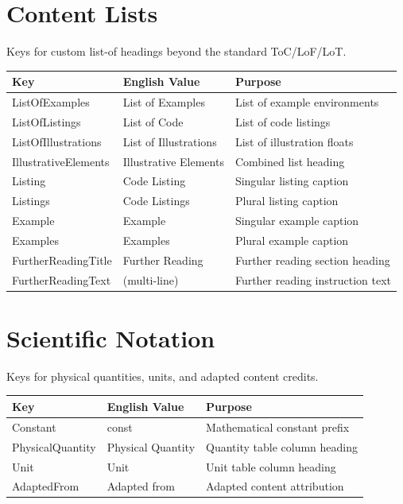 \section{Content Lists}
\label{sec:tl-lists}

Keys for custom list-of headings beyond the standard ToC/LoF/LoT.

\begin{tabularx}{\linewidth}{l l X}
  \toprule
  \textbf{Key} & \textbf{English Value} & \textbf{Purpose} \\
  \midrule
  ListOfExamples       & List of Examples        & List of example environments \\
  ListOfListings       & List of Code             & List of code listings \\
  ListOfIllustrations  & List of Illustrations    & List of illustration floats \\
  IllustrativeElements & Illustrative Elements    & Combined list heading \\
  Listing              & Code Listing             & Singular listing caption \\
  Listings             & Code Listings            & Plural listing caption \\
  Example              & Example                  & Singular example caption \\
  Examples             & Examples                 & Plural example caption \\
  FurtherReadingTitle  & Further Reading          & Further reading section heading \\
  FurtherReadingText   & (multi-line)             & Further reading instruction text \\
  \bottomrule
\end{tabularx}

\section{Scientific Notation}
\label{sec:tl-science}

Keys for physical quantities, units, and adapted content credits.

\begin{tabularx}{\linewidth}{l l X}
  \toprule
  \textbf{Key} & \textbf{English Value} & \textbf{Purpose} \\
  \midrule
  Constant         & const            & Mathematical constant prefix \\
  PhysicalQuantity & Physical Quantity & Quantity table column heading \\
  Unit             & Unit             & Unit table column heading \\
  AdaptedFrom      & Adapted from     & Adapted content attribution \\
  \bottomrule
\end{tabularx}

